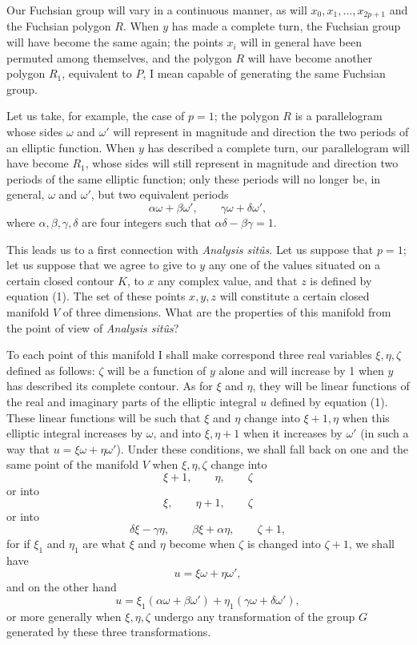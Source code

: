 \documentclass{article}
\begin{document}
Our Fuchsian group will vary in a continuous manner, as will $x_{0}, x_{1}, \ldots, x_{2p+1}$ and the Fuchsian polygon $R$. When $y$ has made a complete turn, the Fuchsian group will have become the same again; the points $x_{i}$ will in general have been permuted among themselves, and the polygon $R$ will have become another polygon $R_{1}$, equivalent to $P$, I mean capable of generating the same Fuchsian group.

Let us take, for example, the case of $p = 1$; the polygon $R$ is a parallelogram whose sides $\omega$ and $\omega'$ will represent in magnitude and direction the two periods of an elliptic function. When $y$ has described a complete turn, our parallelogram will have become $R_{1}$, whose sides will still represent in magnitude and direction two periods of the same elliptic function; only these periods will no longer be, in general, $\omega$ and $\omega'$, but two equivalent periods
\[ \alpha\omega + \beta\omega', \qquad \gamma\omega + \delta\omega', \]
where $\alpha, \beta, \gamma, \delta$ are four integers such that $\alpha\delta - \beta\gamma = 1$.

This leads us to a first connection with \emph{Analysis sitûs}. Let us suppose that $p = 1$; let us suppose that we agree to give to $y$ any one of the values situated on a certain closed contour $K$, to $x$ any complex value, and that $z$ is defined by equation (1). The set of these points $x, y, z$ will constitute a certain closed manifold $V$ of three dimensions. What are the properties of this manifold from the point of view of \emph{Analysis sitûs}?

To each point of this manifold I shall make correspond three real variables $\xi, \eta, \zeta$ defined as follows: $\zeta$ will be a function of $y$ alone and will increase by 1 when $y$ has described its complete contour. As for $\xi$ and $\eta$, they will be linear functions of the real and imaginary parts of the elliptic integral $u$ defined by equation (1). These linear functions will be such that $\xi$ and $\eta$ change into $\xi + 1, \eta$ when this elliptic integral increases by $\omega$, and into $\xi, \eta + 1$ when it increases by $\omega'$ (in such a way that
$u = \xi\omega + \eta\omega'$). Under these conditions, we shall fall back on one and the same point of the manifold $V$ when $\xi, \eta, \zeta$ change into
\[ \xi + 1, \qquad \eta, \qquad \zeta \]
or into
\[ \xi, \qquad \eta + 1, \qquad \zeta \]
or into
\[ \delta\xi - \gamma\eta, \qquad \beta\xi + \alpha\eta, \qquad \zeta + 1, \]
for if $\xi_{1}$ and $\eta_{1}$ are what $\xi$ and $\eta$ become when $\zeta$ is changed into $\zeta + 1$, we shall have
\[ u = \xi\omega + \eta\omega', \]
and on the other hand
\[ u = \xi_{1}(\alpha\omega + \beta\omega') + \eta_{1}(\gamma\omega + \delta\omega'), \]
or more generally when $\xi, \eta, \zeta$ undergo any transformation of the group $G$ generated by these three transformations.
\end{document}
